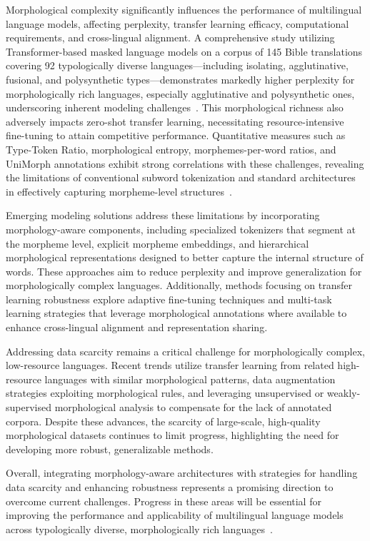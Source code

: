 \documentclass[sigconf]{acmart}
\begin{document}
Morphological complexity significantly influences the performance of multilingual language models, affecting perplexity, transfer learning efficacy, computational requirements, and cross-lingual alignment. A comprehensive study utilizing Transformer-based masked language models on a corpus of 145 Bible translations covering 92 typologically diverse languages—including isolating, agglutinative, fusional, and polysynthetic types—demonstrates markedly higher perplexity for morphologically rich languages, especially agglutinative and polysynthetic ones, underscoring inherent modeling challenges~\cite{ref34}. This morphological richness also adversely impacts zero-shot transfer learning, necessitating resource-intensive fine-tuning to attain competitive performance. Quantitative measures such as Type-Token Ratio, morphological entropy, morphemes-per-word ratios, and UniMorph annotations exhibit strong correlations with these challenges, revealing the limitations of conventional subword tokenization and standard architectures in effectively capturing morpheme-level structures~\cite{ref34}. 

Emerging modeling solutions address these limitations by incorporating morphology-aware components, including specialized tokenizers that segment at the morpheme level, explicit morpheme embeddings, and hierarchical morphological representations designed to better capture the internal structure of words. These approaches aim to reduce perplexity and improve generalization for morphologically complex languages. Additionally, methods focusing on transfer learning robustness explore adaptive fine-tuning techniques and multi-task learning strategies that leverage morphological annotations where available to enhance cross-lingual alignment and representation sharing.

Addressing data scarcity remains a critical challenge for morphologically complex, low-resource languages. Recent trends utilize transfer learning from related high-resource languages with similar morphological patterns, data augmentation strategies exploiting morphological rules, and leveraging unsupervised or weakly-supervised morphological analysis to compensate for the lack of annotated corpora. Despite these advances, the scarcity of large-scale, high-quality morphological datasets continues to limit progress, highlighting the need for developing more robust, generalizable methods.

Overall, integrating morphology-aware architectures with strategies for handling data scarcity and enhancing robustness represents a promising direction to overcome current challenges. Progress in these areas will be essential for improving the performance and applicability of multilingual language models across typologically diverse, morphologically rich languages~\cite{ref34}.
\end{document}
